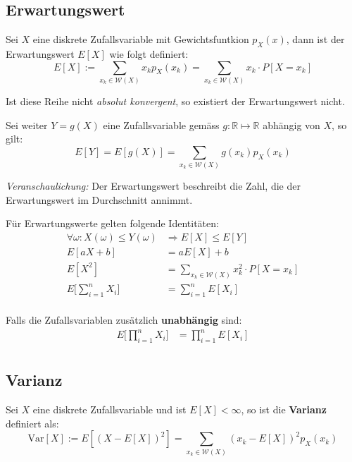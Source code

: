 \documentclass[11pt]{article}
\newcommand{\Var}{\text{Var}}
\begin{document}
\subsection{Erwartungswert}

Sei $X$ eine diskrete Zufallsvariable mit Gewichtsfuntkion $p_X(x)$, dann ist der Erwartungswert $E[X]$ wie folgt definiert:
\begin{equation*}
	E[X] := \sum_{x_k \in \mathcal{W}(X)} x_kp_X(x_k) = \sum_{x_k \in \mathcal{W}(X)} x_k \cdot P[X = x_k]
\end{equation*}

Ist diese Reihe nicht \emph{absolut konvergent}, so existiert der Erwartungswert nicht.

Sei weiter $Y = g(X)$ eine Zufallsvariable gem{\"a}ss $g: \mathbb{R}\mapsto\mathbb{R}$ abh{\"a}ngig von $X$, so gilt:
\begin{equation*}
	E[Y] = E[g(X)] = \sum_{x_k \in \mathcal{W}(X)} g(x_k)p_X(x_k)
\end{equation*}

\emph{Veranschaulichung:} Der Erwartungswert beschreibt die Zahl, die der Erwartungswert im Durchschnitt annimmt.

F{\"u}r Erwartungswerte gelten folgende Identit{\"a}ten:
\begin{equation*}
\begin{split}
	\forall\omega: X(\omega) \leq Y(\omega) & \Rightarrow E[X] \leq E[Y] \\
	E[aX + b] & = aE[X]+b \\
	E[X^2] & = \sum_{x_k \in \mathcal{W}(X)} x_k^2 \cdot P[X = x_k] \\
	E\Bigg[\sum_{i=1}^n X_i\Bigg] & = \sum_{i=1}^n E[X_i] \\
\end{split}
\end{equation*}

Falls die Zufallsvariablen zus{\"a}tzlich \textbf{unabh{\"a}ngig} sind:
\begin{equation*}
\begin{split}
	E\Bigg[\prod_{i=1}^n X_i\Bigg] & = \prod_{i=1}^n E[X_i] \\
\end{split}
\end{equation*}

\subsection{Varianz}

Sei $X$ eine diskrete Zufallsvariable und ist $E[X] < \infty$, so ist die \textbf{Varianz} definiert als:
\begin{equation*}
	\Var[X] := E[(X-E[X])^2] = \sum_{x_k \in \mathcal{W}(X)}(x_k - E[X])^2 p_X(x_k)
\end{equation*}
\end{document}
